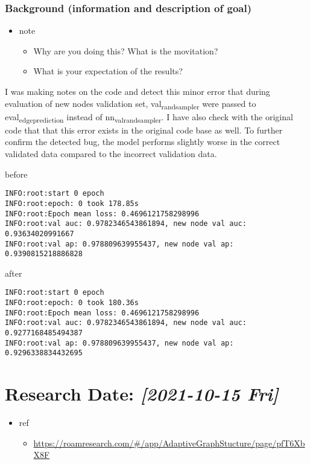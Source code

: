 \documentclass[11pt]{article}
\begin{document}
\subsubsection{Background (information and description of goal)}
\label{sec:orga18330a}
\begin{itemize}
\item note
\begin{itemize}
\item Why are you doing this? What is the movitation?
\item What is your expectation of the results?
\end{itemize}
\end{itemize}
I was making notes on the code and detect this minor error that during evaluation of new nodes validation set, val\textsubscript{rand}\textsubscript{sampler} were passed to eval\textsubscript{edge}\textsubscript{prediction} instead of nn\textsubscript{val}\textsubscript{rand}\textsubscript{sampler}. I have also check with the original code that that this error exists in the original code base as well. To further confirm the detected bug, the model performs slightly worse in the correct validated data compared to the incorrect validation data.

before
\begin{verbatim}
INFO:root:start 0 epoch
INFO:root:epoch: 0 took 178.85s
INFO:root:Epoch mean loss: 0.4696121758298996
INFO:root:val auc: 0.9782346543861894, new node val auc: 0.93634020991667
INFO:root:val ap: 0.978809639955437, new node val ap: 0.9390815218886828
\end{verbatim}

after
\begin{verbatim}
INFO:root:start 0 epoch
INFO:root:epoch: 0 took 180.36s
INFO:root:Epoch mean loss: 0.4696121758298996
INFO:root:val auc: 0.9782346543861894, new node val auc: 0.9277168485494387
INFO:root:val ap: 0.978809639955437, new node val ap: 0.9296338834432695
\end{verbatim}
\section{Research Date: \textit{[2021-10-15 Fri]}}
\label{sec:org83c59c7}
\begin{itemize}
\item ref
\begin{itemize}
\item \url{https://roamresearch.com/\#/app/AdaptiveGraphStucture/page/pfT6XbX8F}
\end{itemize}
\end{itemize}
\end{document}
